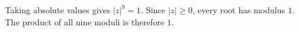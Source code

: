 Taking absolute values gives $|z|^9=1 $. Since $|z|\ge0 $, every root has modulus $ 1 $. The product of all nine moduli is therefore $\boxed1 $.
